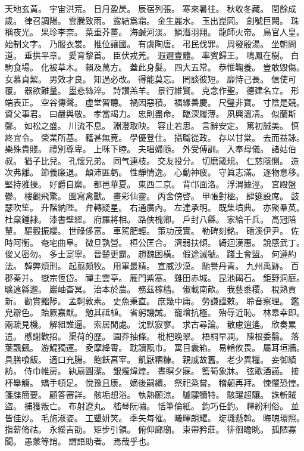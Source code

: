 天地玄黃。%
宇宙洪荒。%
日月盈昃。%
辰宿列張。%
寒來暑往。%
秋收冬藏。%
閏餘成歲。%
律召調陽。%
雲騰致雨。%
露結爲霜。%
金生麗水。%
玉出崑岡。%
劍號巨闕。%
珠稱夜光。%
果珍李柰。%
菜重芥薑。%
海鹹河淡。%
鱗潛羽翔。%
龍師火帝。%
鳥官人皇。%
始制文字。%
乃服衣裳。%
推位讓國。%
有虞陶唐。%
弔民伐罪。%
周發殷湯。%
坐朝問道。%
垂拱平章。%
愛育黎首。%
臣伏戎羌。%
遐邇壹體。%
率賓歸王。%
鳴鳳在樹。%
白駒食場。%
化被草木。%
賴及萬方。%
蓋此身髮。%
四大五常。%
恭惟鞠養。%
豈敢毀傷。%
女慕貞絜。%
男效才良。%
知過必改。%
得能莫忘。%
罔談彼短。%
靡恃己長。%
信使可覆。%
器欲難量。%
墨悲絲淬。%
詩讃羔羊。%
景行維賢。%
克念作聖。%
德建名立。%
形端表正。%
空谷傳聲。%
虛堂習聽。%
禍因惡積。%
福緣善慶。%
尺璧非寶。%
寸陰是競。%
資父事君。%
曰嚴與敬。%
孝當竭力。%
忠則盡命。%
臨深履薄。%
夙興溫凊。%
似蘭斯馨。%
如松之盛。%
川流不息。%
淵澄取映。%
容止若思。%
言辭安定。%
篤初誠美。%
慎終宜令。%
榮業所基。%
籍甚無竟。%
學優登仕。%
攝職從政。%
存以甘棠。%
去而益詠。%
樂殊貴賤。%
禮別尊卑。%
上咊下睦。%
夫唱婦隨。%
外受傅訓。%
入奉母儀。%
諸姑伯叔。%
猶子比兒。%
孔懷兄弟。%
同气連枝。%
交友投分。%
切磨箴規。%
仁慈隱惻。%
造次弗離。%
節義廉退。%
顛沛匪虧。%
性靜情逸。%
心動神疲。%
守眞志滿。%
逐物意移。%
堅持雅操。%
好爵自縻。%
都邑華夏。%
東西二京。%
背邙面洛。%
浮渭據涇。%
宮殿盤鬱。%
樓觀飛驚。%
圖寫禽獸。%
畫彩仙靈。%
丙舍傍啓。%
甲帳對楹。%
肆筵設席。%
鼓瑟吹笙。%
升階納陛。%
弁轉疑星。%
右通廣內。%
左達承明。%
既集墳典。%
亦聚羣英。%
杜稾鍾隸。%
漆書壁經。%
府羅將相。%
路俠槐卿。%
戶封八縣。%
家給千兵。%
高冠陪輦。%
驅轂振纓。%
世祿侈富。%
車駕肥輕。%
策功茂實。%
勒碑刻銘。%
磻溪伊尹。%
佐時阿衡。%
奄宅曲阜。%
微旦孰營。%
桓公匡合。%
濟弱扶傾。%
綺迴漢惠。%
說感武丁。%
俊乂密勿。%
多士寔寧。%
晉楚更霸。%
趙魏困橫。%
假途滅虢。%
踐土會盟。%
何遵約法。%
韓弊煩刑。%
起翦頗牧。%
用軍最精。%
宣威沙漠。%
馳譽丹青。%
九州禹跡。%
百郡秦并。%
嶽宗恆岱。%
禪主雲亭。%
雁門紫塞。%
雞田赤城。%
昆池碣石。%
鉅野洞庭。%
曠遠緜邈。%
巖岫杳冥。%
治本於農。%
務茲稼穡。%
俶載南畝。%
我藝黍稷。%
稅熟貢新。%
勸賞黜陟。%
孟軻敦素。%
史魚秉直。%
庶幾中庸。%
勞謙謹敕。%
聆音察理。%
鑑皃辧色。%
貽厥嘉猷。%
勉其祗植。%
省躬譏誡。%
寵增抗極。%
殆辱近恥。%
林皋幸即。%
兩疏見機。%
解組誰逼。%
索居閒處。%
沈默寂寥。%
求古尋論。%
散慮逍遙。%
欣奏累遣。%
慼謝歡招。%
渠荷的歷。%
園莽抽條。%
枇杷晚翠。%
梧桐早凋。%
陳根委翳。%
落葉飄颻。%
游鯤獨運。%
夌摩絳霄。%
耽讀翫市。%
寓目囊箱。%
易輶攸畏。%
屬耳垣牆。%
具膳喰飯。%
適口充腸。%
飽飫亯宰。%
飢厭糟糠。%
親戚故舊。%
老少異糧。%
妾御績紡。%
侍巾帷房。%
紈扇圓潔。%
銀燭煒煌。%
晝瞑夕寐。%
籃筍象牀。%
弦歌酒讌。%
接杯舉觴。%
矯手頓足。%
悅豫且康。%
嫡後嗣續。%
祭祀烝嘗。%
稽顙再拜。%
悚懼恐惶。%
箋牒簡要。%
顧答審詳。%
骸垢想浴。%
執熱願涼。%
驢騾犢特。%
駭躍超驤。%
誅斬賊盜。%
捕獲叛亡。%
布射遼丸。%
嵇琴阮嘯。%
恬筆倫紙。%
鈞巧任釣。%
釋紛利俗。%
並皆佳妙。%
毛施淑姿。%
工顰妍笑。%
秊矢每催。%
曦暉朗耀。%
琁璣懸斡。%
晦魄環照。%
指薪脩祜。%
永綏吉劭。%
矩步引領。%
俯仰廊廟。%
束帶矜莊。%
徘徊瞻眺。%
孤陋寡聞。%
愚蒙等誚。%
謂語助者。%
焉哉乎也。%
%
%
%

